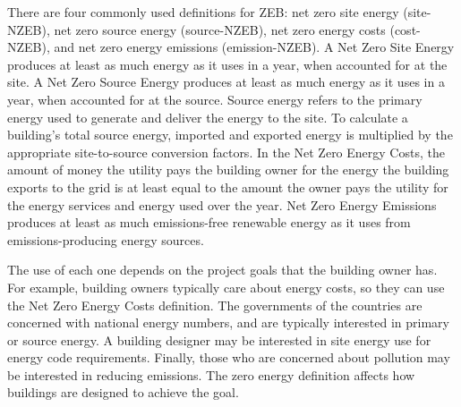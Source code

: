 There are four commonly used definitions for ZEB: net zero site energy (site-NZEB), net zero source energy (source-NZEB), net zero energy costs (cost-NZEB), and net zero energy emissions (emission-NZEB). A Net Zero Site Energy produces at least as much energy as it uses in a year, when accounted for at the site. A Net Zero Source Energy produces at least as much energy as it uses in a year, when accounted for at the source. Source energy refers to the primary energy used to generate and deliver the energy to the site. To calculate a building's total source energy, imported and exported energy is multiplied by the appropriate site-to-source conversion factors. In the Net Zero Energy Costs, the amount of money the utility pays the building owner for the energy the building exports to the grid is at least equal to the amount the owner pays the utility for the energy services and energy used over the year. Net Zero Energy Emissions produces at least as much emissions-free renewable energy as it uses from emissions-producing energy sources. 

The use of each one depends on the project goals that the building owner has. For example, building owners typically care about energy costs, so they can use the Net Zero Energy Costs definition. The governments of the countries are concerned with national energy numbers, and are typically interested in primary or source energy. A building designer may be interested in site energy use for energy code requirements. Finally, those who are concerned about pollution may be interested in reducing emissions. The zero energy definition affects how buildings are designed to achieve the goal.



